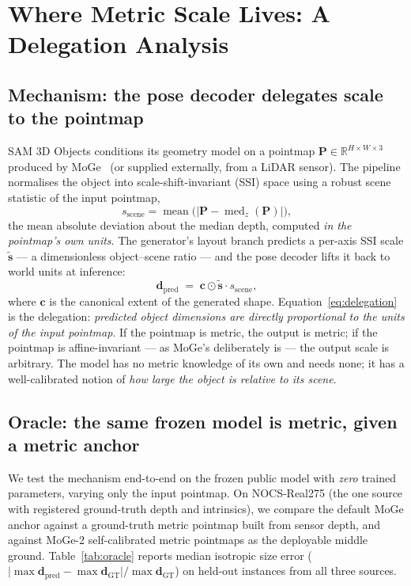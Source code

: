\documentclass[runningheads]{llncs}
\begin{document}
\section{Where Metric Scale Lives: A Delegation Analysis}
\label{sec:analysis}

\subsection{Mechanism: the pose decoder delegates scale to the pointmap}
\label{sec:mechanism}

SAM 3D Objects conditions its geometry model on a pointmap
$\mathbf{P} \in \mathbb{R}^{H \times W \times 3}$ produced by MoGe~\cite{moge} (or supplied
externally, \eg from a LiDAR sensor). The pipeline normalises the object into
scale-shift-invariant (SSI) space using a robust scene statistic of the input pointmap,
\begin{equation}
  s_\text{scene} = \operatorname{mean}\bigl(\lvert \mathbf{P} - \operatorname{med}_z(\mathbf{P}) \rvert\bigr),
  \label{eq:scenescale}
\end{equation}
the mean absolute deviation about the median depth, computed \emph{in the pointmap's own
units}. The generator's layout branch predicts a per-axis SSI scale
$\tilde{\mathbf{s}}$ --- a dimensionless object--scene ratio --- and the pose decoder lifts
it back to world units at inference:
\begin{equation}
  \mathbf{d}_\text{pred} \;=\; \mathbf{c} \odot \tilde{\mathbf{s}} \cdot s_\text{scene},
  \label{eq:delegation}
\end{equation}
where $\mathbf{c}$ is the canonical extent of the generated shape. Equation~\ref{eq:delegation}
is the delegation: \emph{predicted object dimensions are directly proportional to the units
of the input pointmap}. If the pointmap is metric, the output is metric; if the pointmap is
affine-invariant --- as MoGe's deliberately is --- the output scale is arbitrary. The model
has no metric knowledge of its own and needs none; it has a well-calibrated notion of
\emph{how large the object is relative to its scene}.

\subsection{Oracle: the same frozen model is metric, given a metric anchor}
\label{sec:oracle}

We test the mechanism end-to-end on the frozen public model with \emph{zero} trained
parameters, varying only the input pointmap. On NOCS-Real275 (the one source with
registered ground-truth depth and intrinsics), we compare the default MoGe anchor against
a ground-truth metric pointmap built from sensor depth, and against MoGe-2 self-calibrated
metric pointmaps as the deployable middle ground. Table~\ref{tab:oracle} reports median
isotropic size error ($\lvert \max\mathbf{d}_\text{pred} - \max\mathbf{d}_\text{GT}\rvert / \max\mathbf{d}_\text{GT}$)
on held-out instances from all three sources.
\end{document}
